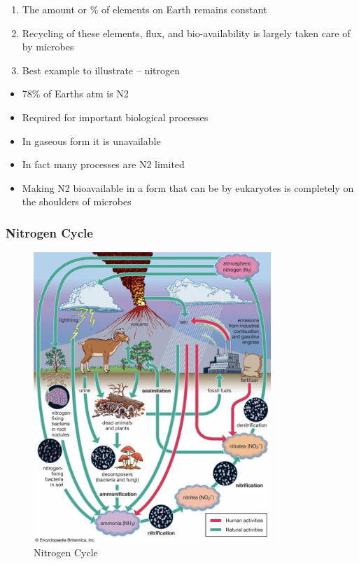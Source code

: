\documentclass[
]{book}
\providecommand{\tightlist}{%
  \setlength{\itemsep}{0pt}\setlength{\parskip}{0pt}}
\begin{document}
\begin{enumerate}
\def\labelenumi{\arabic{enumi}.}
\tightlist
\item
  The amount or \% of elements on Earth remains constant
\item
  Recycling of these elements, flux, and bio-availability is
  largely taken care of by microbes
\item
  Best example to illustrate -- nitrogen
\end{enumerate}

\begin{itemize}
\tightlist
\item
  78\% of Earths atm is N2
\item
  Required for important biological processes
\item
  In gaseous form it is unavailable
\item
  In fact many processes are N2 limited
\item
  Making N2 bioavailable in a form that can be
  by eukaryotes is completely on the shoulders of microbes
\end{itemize}

\hypertarget{nitrogen-cycle}{%
\subsubsection{Nitrogen Cycle}\label{nitrogen-cycle}}

\begin{figure}
\centering
\includegraphics[width=0.8\textwidth,height=\textheight]{./Figures/Nitrogen.png}
\caption{Nitrogen Cycle}
\end{figure}
\end{document}
